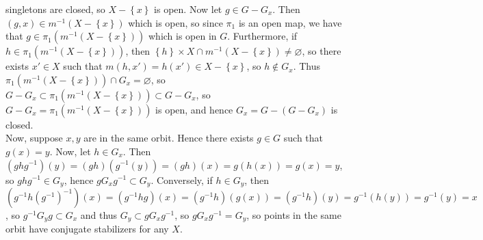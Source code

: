 \documentclass[a4paper]{article}
\begin{document}
        singletons are closed, so $X - \left\{ x \right\} $ is open. Now let
        $g \in G - G_x$. Then
        $(g,x) \in m^{-1}\left( X - \left\{ x \right\}  \right) $ which
        is open, so since $\pi_1$ is an open map, we have that
        $g \in \pi_1 \left( m^{-1}\left( X - \left\{ x \right\}  \right)
        \right) $ which is open in $G$. Furthermore,
        if $h \in \pi_1 \left( m^{-1}\left( X- \left\{ x \right\}  \right)
        \right) $, then $\left\{ h \right\} \times X \cap 
        m^{-1}\left( X-\left\{ x \right\}  \right) \neq \varnothing$, so there
        exists $x' \in X$ such that $m(h,x') = h(x') \in X - \left\{ x \right\}
        $, so $h \not\in G_x$. Thus
        $\pi_1 \left( m^{-1}\left( X- \left\{ x \right\}  \right)  \right) 
        \cap G_x = \varnothing$, so
        $G - G_x \subset \pi_1 \left( m^{-1}\left( X- \left\{ x \right\}  \right)  \right) 
        \subset G-G_x$, so
        $G - G_x = \pi_1 \left( m^{-1}\left( X - \left\{ x \right\}  \right)
        \right) $ is open, and hence
        $G_x = G - \left( G-G_x \right) $ is closed.\\
        \linebreak
        Now, suppose $x,y$ are in the same orbit. Hence
        there exists $g \in G$ such that
        $g(x) = y$. Now, let $h \in G_x$. Then
        $(ghg^{-1})(y) = (gh)(g^{-1}(y)) =
        (gh)(x) = g(h(x)) = g(x) = y$, so
        $ghg^{-1} \in G_y$, hence
        $g G_x g^{-1} \subset G_y$. Conversely, if
        $h \in G_y$, then
        $\left( g^{-1} h \left( g^{-1} \right)^{-1} \right) (x)
        = \left( g^{-1}hg \right) (x)
        = \left( g^{-1}h \right) (g(x))
        = \left( g^{-1}h \right) (y)
        = g^{-1}\left( h(y) \right) 
        = g^{-1}(y) = x$, so
        $g^{-1} G_y g \subset G_x$ and thus
        $G_y \subset g G_x g^{-1}$, so
        $g G_x g^{-1} = G_y$, so
        points in the same orbit have conjugate stabilizers for any $X$.
\end{document}
